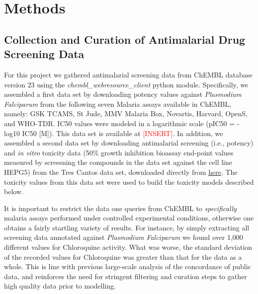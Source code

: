 \documentclass{article}
\begin{document}
\section{Methods}

\subsection{Collection and Curation of Antimalarial Drug Screening Data}

For this project we gathered antimalarial screening data from ChEMBL database version 23 using the {\it chembl\_webresource\_client} python module\cite{Davies2015}.
Specifically, we assembled a first data set by downloading potency values against \textit{Plasmodium Falciparum} from the following seven Malaria assays available in ChEMBL, namely: GSK TCAMS, St Jude, MMV Malaria Box, Novartis, Harvard, OpenS, and WHO-TDR.
IC50 values were modeled in a logarithmic scale (pIC50 = -log10 IC50 [M]). This data set is available at \textcolor{red}{[INSERT]}.
\newline
\newline
In addition, we assembled a second data set by downloading antimalarial screening (i.e., potency) and {\it in vitro} toxicity data (50\% growth inhibition bioassay end-point values measured by screesning the compounds in the data set against the cell line HEPG5) from the Tres Cantos data set, downloaded directly from \href{https://chembl.gitbook.io/chembl-ntd/downloads/deposited-set-1-gsk-tcams-dataset-20th-may-2010}{here}. The toxicity values from this data set were used to build the toxicity models described below.
\newline
\newline


It is important to restrict the data one queries from ChEMBL to \textit{specifically} malaria assays performed under controlled experimental conditions, otherwise one obtains a fairly startling variety of results. 
For instance, by simply extracting all screening data annotated against 
\textit{Plasmodium Falciparum} we found over 1,000 different values for Chloroquine activity. What was worse, the standard deviation of the recorded values for Chloroquine was greater than that for the data as a whole. This is line with previous large-scale analysis of the concordance of public data\cite{Kalliokoski2013,Kalliokoski2013B,Cortes-Ciriano2015}, and reinforces the need for stringent filtering and curation steps to gather high quality data prior to modelling.
\end{document}
